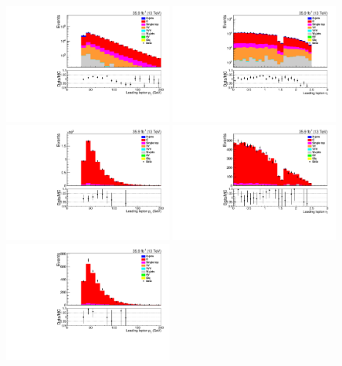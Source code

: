 \begin{figure}[ht]
\centering
\includegraphics[width=0.49\textwidth]{figs/background-estimation/plots/unblinded/ttbar_control/lep1Pt_SingleTop_lepSel_emu_log.pdf}
\includegraphics[width=0.49\textwidth]{figs/background-estimation/plots/unblinded/ttbar_control/lep1Eta_SingleTop_lepSel_emu_log.pdf}
\\
\includegraphics[width=0.49\textwidth]{figs/background-estimation/plots/unblinded/ttbar_control/lep1Pt_SingleTop_jetSel_emu.pdf}
\includegraphics[width=0.49\textwidth]{figs/background-estimation/plots/unblinded/ttbar_control/lep1Eta_SingleTop_jetSel_emu.pdf}
\\
\includegraphics[width=0.49\textwidth]{figs/background-estimation/plots/unblinded/ttbar_control/lep1Pt_SingleTop_wMass_emu.pdf}

\end{figure}
